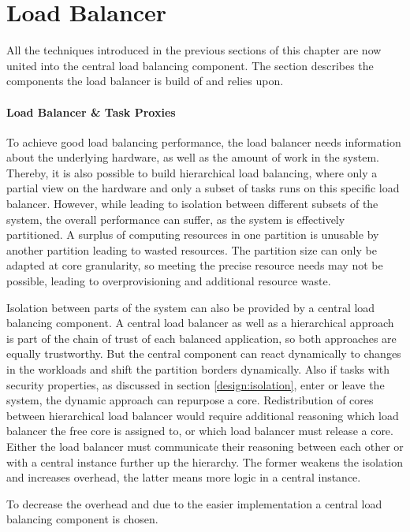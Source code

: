 \section{Load Balancer}
\label{design:threadmapper}

All the techniques introduced in the previous sections of this chapter
are now united into the central load balancing component.
The section describes the components the load balancer is build of and relies
upon.


\paragraph{Load Balancer \& Task Proxies}
To achieve good load balancing performance, the load balancer needs information
about the underlying hardware, as well as the amount of work in the system.
Thereby, it is also possible to build hierarchical load balancing, where
only a partial view on the hardware and only a subset of tasks runs on this
specific load balancer.
However, while leading to isolation between different subsets of the system,
the overall performance can suffer, as the system is effectively partitioned.
A surplus of computing resources in one partition is unusable by another
partition leading to wasted resources.
The partition size can only be adapted at core granularity, so meeting the
precise resource needs may not be possible, leading to overprovisioning and
additional resource waste.

Isolation between parts of the system can also be provided by a central load
balancing component.
A central load balancer as well as a hierarchical approach is part of the chain
of trust of each balanced application, so both approaches are equally
trustworthy.
But the central component can react dynamically to changes in the workloads and
shift the partition borders dynamically.
Also if tasks with security properties, as discussed in section
\ref{design:isolation}, enter or leave the system, the dynamic approach can
repurpose a core.
Redistribution of cores between hierarchical load balancer would require
additional reasoning which load balancer the free core is assigned to, or which
load balancer must release a core.
Either the load balancer must communicate their reasoning between each other or
with a central instance further up the hierarchy.
The former weakens the isolation and increases overhead, the latter means more
logic in a central instance.

To decrease the overhead and due to the easier implementation a central load
balancing component is chosen.

